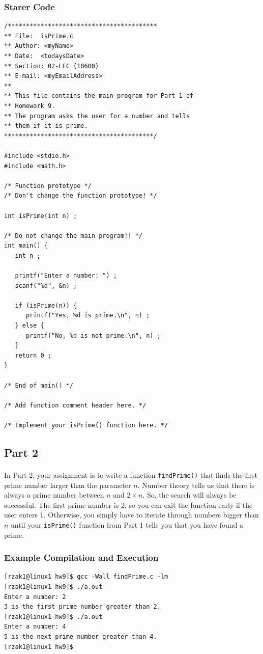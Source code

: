 \documentclass[letter,11pt]{article}
\begin{document}
\subsubsection*{Starer Code}
\begin{verbatim}
/*****************************************
** File:  isPrime.c
** Author: <myName>
** Date:  <todaysDate>
** Section: 02-LEC (10600)
** E-mail: <myEmailAddress>
**
** This file contains the main program for Part 1 of
** Homework 9.
** The program asks the user for a number and tells
** them if it is prime.
*****************************************/

#include <stdio.h>
#include <math.h>

/* Function prototype */
/* Don't change the function prototype! */

int isPrime(int n) ;

/* Do not change the main program!! */
int main() {
   int n ;

   printf("Enter a number: ") ;
   scanf("%d", &n) ;

   if (isPrime(n)) {
      printf("Yes, %d is prime.\n", n) ;
   } else {
      printf("No, %d is not prime.\n", n) ;
   }
   return 0 ;
}

/* End of main() */

/* Add function comment header here. */

/* Implement your isPrime() function here. */
\end{verbatim}

\subsection*{Part 2}
\paragraph{}In Part 2, your assignment is to write a function \texttt{findPrime()} that finds the first prime number larger than the parameter $n$. Number theory tells us that there is always a prime number between $n$ and $2 \times n$. So, the search will always be successful. The first prime number is 2, so you can exit the function early if the user enters 1. Otherwise, you simply have to iterate through numbers bigger than $n$ until your \texttt{isPrime()} function from Part 1 tells you that you have found a prime.

\subsubsection*{Example Compilation and Execution}
\begin{verbatim}
[rzak1@linux1 hw9]$ gcc -Wall findPrime.c -lm
[rzak1@linux1 hw9]$ ./a.out
Enter a number: 2
3 is the first prime number greater than 2.
[rzak1@linux1 hw9]$ ./a.out
Enter a number: 4
5 is the next prime number greater than 4.
[rzak1@linux1 hw9]$
\end{verbatim}
\end{document}
